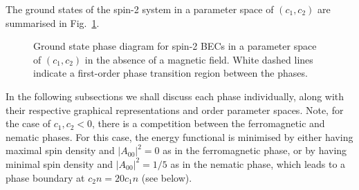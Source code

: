 The ground states of the spin-2 system in a parameter space of \((c_1, c_2)\)
are summarised in Fig.~\ref{fig: spin-2-ground-states}.
\begin{figure}
    \centering
    \caption[Spin-2 ground state phase diagram]
    {\label{fig: spin-2-ground-states}Ground state phase diagram for
        spin-2 BECs in a parameter space of \((c_1, c_2)\) in the absence of a
        magnetic field.
        White dashed lines indicate a first-order phase transition region
        between the phases.}
\end{figure}
In the following subsections we shall discuss each phase individually, along
with their respective graphical representations and order parameter spaces.
Note, for the case of \(c_1, c_2 < 0\), there is a competition between
the ferromagnetic and nematic phases.
For this case, the energy functional is minimised by either having maximal spin
density and \(|A_{00}|^2 = 0\) as in the ferromagnetic phase, or by having
minimal spin density and \(|A_{00}|^2 = 1/5\) as in the nematic phase, which
leads to a phase boundary at \(c_2n=20c_1n\) (see below).

